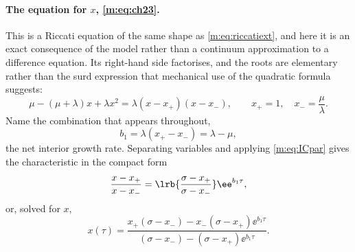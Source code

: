 \paragraph{The equation for $x$, \eqref{m:eq:ch23}.}
This is a Riccati equation of the same shape as \cref{m:eq:riccatiext}, and here it
is an exact consequence of the model rather than a continuum approximation to a
difference equation. Its right-hand
side factorises, and the roots are elementary rather than the surd expression that
mechanical use of the quadratic formula suggests:
\begin{equation}
\label{m:eq:xpm}
\mu-(\mu+\lambda)x+\lambda x^2 = \lambda(x-x_+)(x-x_-),
\qquad
x_+ = 1,\quad x_- = \frac{\mu}{\lambda} .
\end{equation}
Name the combination that appears throughout,
\begin{equation}
\label{m:eq:b1}
b_1 = \lambda(x_+-x_-) = \lambda-\mu ,
\end{equation}
the net interior growth rate. Separating variables and applying \cref{m:eq:ICpar}
gives the characteristic in the compact form
\begin{equation}
\label{m:eq:xratio}
\frac{x-x_+}{x-x_-} = \lrb{\frac{\sigma-x_+}{\sigma-x_-}}\ee^{b_1\tau},
\end{equation}
or, solved for $x$,
\begin{equation}
\label{m:eq:xabd}
x(\tau) = \frac{x_+(\sigma-x_-) - x_-(\sigma-x_+)\ee^{b_1\tau}}
{(\sigma-x_-) - (\sigma-x_+)\ee^{b_1\tau}} .
\end{equation}

